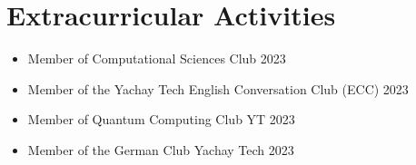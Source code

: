 \documentclass[a4paper,12pt]{article}
\begin{document}
\begin{comment}
\begin{refsection}[citations.bib]
\nocite{*}
\printbibliography[heading=none]
\end{refsection}
\end{comment}


\section{Extracurricular Activities}
\begin{itemize}
    \item Member of Computational Sciences Club \hfill {2023}
    \item Member of the Yachay Tech English Conversation Club (ECC) \hfill {2023}
    \item Member of Quantum Computing Club YT \hfill {2023}
    \item Member of the German Club Yachay Tech \hfill {2023}
\end{itemize}

\vfill
{}
\end{document}

